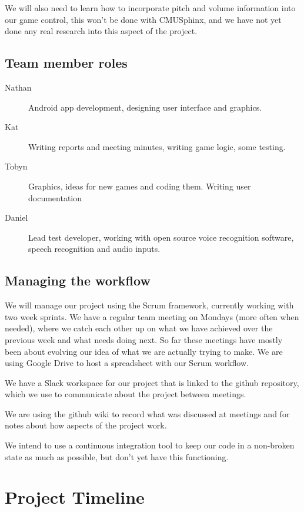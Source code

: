 \documentclass[11pt, oneside]{article}
\begin{document}
We will also need to learn how to incorporate pitch and volume
information into our game control, this won't be done with CMUSphinx,
and we have not yet done any real research into this aspect of the
project.


\subsection*{Team member roles}

\begin{description}
\item [Nathan] Android app development, designing user interface and
  graphics.
\item [Kat] Writing reports and meeting minutes, writing game logic,
  some testing.
\item [Tobyn] Graphics, ideas for new games and coding them. Writing
  user documentation
\item [Daniel] Lead test developer, working with open source voice
  recognition software, speech recognition and audio inputs.
\end{description}


\subsection*{Managing the workflow}

We will manage our project using the Scrum framework, currently
working with two week sprints. We have a regular team meeting on
Mondays (more often when needed), where we catch each other up on what
we have achieved over the previous week and what needs doing next. So
far these meetings have mostly been about evolving our idea of what we
are actually trying to make. We are using Google Drive to host a
spreadsheet with our Scrum workflow.

We have a Slack workspace for our project that is linked to the github
repository, which we use to communicate about the project between
meetings.

We are using the github wiki to record what was discussed at meetings
and for notes about how aspects of the project work.

We intend to use a continuous integration tool to keep our code in a non-broken 
state as much as possible, but don't yet have this functioning.

\section*{Project Timeline}
\end{document}
